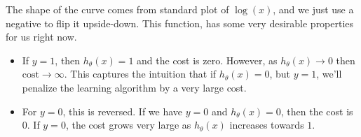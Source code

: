 The shape of the curve comes from standard plot of $\log\left(x\right)$, and we just use a negative to flip it upside-down. This function, has some very desirable properties for us right now. 


\noindent \begin{minipage}{\linewidth}
\begin{itemize}
\item If $y = 1$, then $h_\theta\left(x\right) = 1$ and the cost is zero. However, as $h_\theta\left(x\right) \to 0$ then $\text{cost} \to \infty$. This captures the intuition that if $h_\theta\left(x\right) = 0$, but $y=1$, we'll penalize the learning algorithm by a very large cost. 
\item For $y=0$, this is reversed. If we have $y=0$ and $h_\theta\left(x\right) = 0$, then the cost is $0$. If $y=0$, the cost grows very large as $h_\theta\left(x\right)$ increases towards $1$. 
\end{itemize}
\end{minipage}


